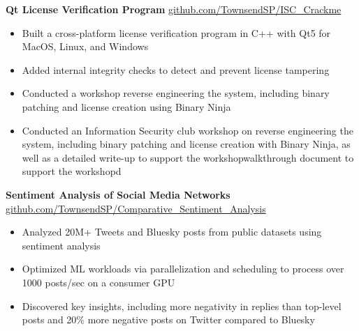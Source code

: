 \documentclass[11pt]{article}       %
\begin{document}
	\textbf{Qt License Verification Program} \hfill \href{https://github.com/TownsendSP/ISC_Crackme}{github.com/TownsendSP/ISC\_Crackme} \\
	\vspace{-9pt}
	\begin{itemize}
		\item Built a cross-platform license verification program in C++ with Qt5 for MacOS, Linux, and Windows
		\item Added internal integrity checks to detect and prevent license tampering
		\item Conducted a workshop reverse engineering the system, including binary patching and license creation using Binary Ninja
		\item Conducted an Information Security club workshop on reverse engineering the system, including binary patching and license creation with Binary Ninja, as well as a detailed write-up to support the workshopwalkthrough document to support the workshopd
	\end{itemize}
	
	\vspace{-7pt}
	
	\textbf{Sentiment Analysis of Social Media Networks} \hfill \href{https://github.com/TownsendSP/Comparative_Sentiment_Analysis}{github.com/TownsendSP/Comparative\_Sentiment\_Analysis} \\
	\vspace{-9pt}
	\begin{itemize}
		\item Analyzed 20M+ Tweets and Bluesky posts from public datasets using sentiment analysis
		\item Optimized ML workloads via parallelization and scheduling to process over 1000 posts/sec on a consumer GPU
		\item Discovered key insights, including more negativity in replies than top-level posts and 20\% more negative posts on Twitter compared to Bluesky
	\end{itemize}
	
	\vspace{-25pt}
	
\end{document}
